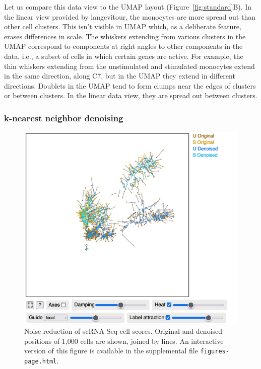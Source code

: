 Let us compare this data view to the UMAP layout (Figure~\ref{fig:standard}B). In the linear view provided by langevitour, the monocytes are more spread out than other cell clusters. This isn't visible in UMAP which, as a deliberate feature, erases differences in scale. The whiskers extending from various clusters in the UMAP correspond to components at right angles to other components in the data, i.e., a subset of cells in which certain genes are active. For example, the thin whiskers extending from the unstimulated and stimulated monocytes extend in the same direction, along C7, but in the UMAP they extend in different directions. Doublets in the UMAP tend to form clumps near the edges of clusters or between clusters. In the linear data view, they are spread out between clusters.

\hypertarget{k-nearest-neighbor-denoising}{%
\subsubsection{k-nearest neighbor denoising}\label{k-nearest-neighbor-denoising}}

\begin{figure}
\centering
\includegraphics{langevitour-article_files/figure-latex/denoising-1.pdf}
\caption{\label{fig:denoising}Noise reduction of scRNA-Seq cell scores. Original and denoised positions of 1,000 cells are shown, joined by lines. An interactive version of this figure is available in the supplemental file \texttt{figures-page.html}.}
\end{figure}


